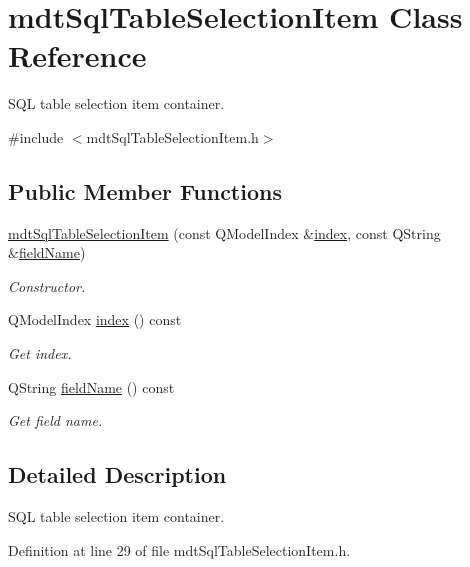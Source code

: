 \hypertarget{classmdt_sql_table_selection_item}{\section{mdt\-Sql\-Table\-Selection\-Item Class Reference}
\label{classmdt_sql_table_selection_item}
}


S\-Q\-L table selection item container.  




{\ttfamily \#include $<$mdt\-Sql\-Table\-Selection\-Item.\-h$>$}

\subsection*{Public Member Functions}
\begin{DoxyCompactItemize}
\item 
\hyperlink{classmdt_sql_table_selection_item_ae39ec784f7a42be4d3875af4dd124165}{mdt\-Sql\-Table\-Selection\-Item} (const Q\-Model\-Index \&\hyperlink{classmdt_sql_table_selection_item_a7ad045faa81bac051729783c14aa2658}{index}, const Q\-String \&\hyperlink{classmdt_sql_table_selection_item_a7b986c5dbbaf34cffc1a0b0a94aaac0b}{field\-Name})
\begin{DoxyCompactList}\small\item\em Constructor. \end{DoxyCompactList}\item 
Q\-Model\-Index \hyperlink{classmdt_sql_table_selection_item_a7ad045faa81bac051729783c14aa2658}{index} () const 
\begin{DoxyCompactList}\small\item\em Get index. \end{DoxyCompactList}\item 
Q\-String \hyperlink{classmdt_sql_table_selection_item_a7b986c5dbbaf34cffc1a0b0a94aaac0b}{field\-Name} () const 
\begin{DoxyCompactList}\small\item\em Get field name. \end{DoxyCompactList}\end{DoxyCompactItemize}


\subsection{Detailed Description}
S\-Q\-L table selection item container. 

Definition at line 29 of file mdt\-Sql\-Table\-Selection\-Item.\-h.



